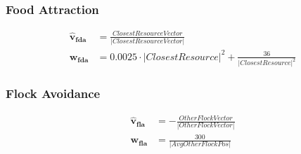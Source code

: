 \subsubsection{Food Attraction}
\begin{equation}
\begin{split}
	\boldsymbol{\hat{v}_{fda}} &= \frac{ClosestResourceVector} {|ClosestResourceVector|} \\
	\boldsymbol{w_{fda}} &= 0.0025 \cdot |ClosestResource|^2 + \frac{36} {|ClosestResource|^2}
\end{split}
\label{foodattraction_equation}
\end{equation}

\subsubsection{Flock Avoidance}
\begin{equation}
\begin{split}
	\boldsymbol{\hat{v}_{fla}} &= -\frac{OtherFlockVector} {|OtherFlockVector|} \\
	\boldsymbol{w_{fla}} &= \frac{300} {|AvgOtherFlockPos|}
\end{split}
\label{flockavoidance_equation}
\end{equation}

